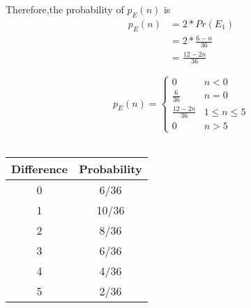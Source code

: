 \documentclass[journal,12pt,twocolumn]{IEEEtran}
\renewcommand\thesection{\arabic{section}}
\begin{document}
Therefore,the probability of $p_E(n)$ is
\begin{align}
	p_E(n)&=2*Pr(E_1)\nonumber\\
	&=2*\frac{6-n}{36}\nonumber\\
	&=\frac{12-2n}{36}\nonumber
\end{align} 



\begin{equation}
p_{E}(n) =  
\begin{cases}
    0 &  n <  0  \\
    \frac{6}{36} & n=0\\
    \frac{12-2n}{36}& 1\leq  n\leq 5\\
    0 &  n>5
\end{cases}
\label{eq:pmf}
\end{equation}\\
\begin{center}
  \begin{tabular}{| c | c |}
    \hline
    Difference & Probability \\ \hline
    0 & 6/36\\
    1 & 10/36 \\ 
    2 & 8/36 \\ 
    3 & 6/36 \\ 
    4 & 4/36 \\ 
    5 & 2/36 \\  
    \hline
  \end{tabular}
\end{center}


%



\end{document}
